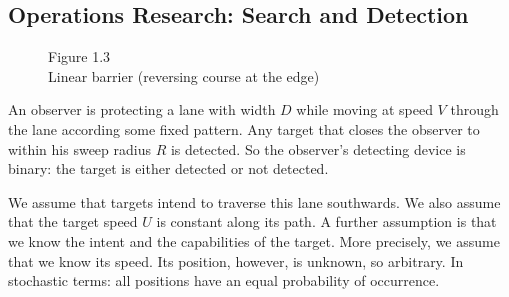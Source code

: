 \subsection*{Operations Research: Search and Detection}

\begin{figure}[h]
\centering
{}
\caption*{Figure 1.3 \\ Linear barrier (reversing course at the edge)}
\end{figure}

An observer is protecting a lane with width $D$ while moving at speed $V$ through the lane according some fixed pattern. Any target that closes the observer to within his sweep radius $R$ is detected. So the observer's detecting device is binary: the target is either detected or not detected.

We assume that targets intend to traverse this lane southwards. We also assume that the target speed $U$ is constant along its path. A further assumption is that we know the intent and the capabilities of the target. More precisely, we assume that we know its speed. Its position,
however, is unknown, so arbitrary. In stochastic terms: all positions have an equal probability of occurrence.

